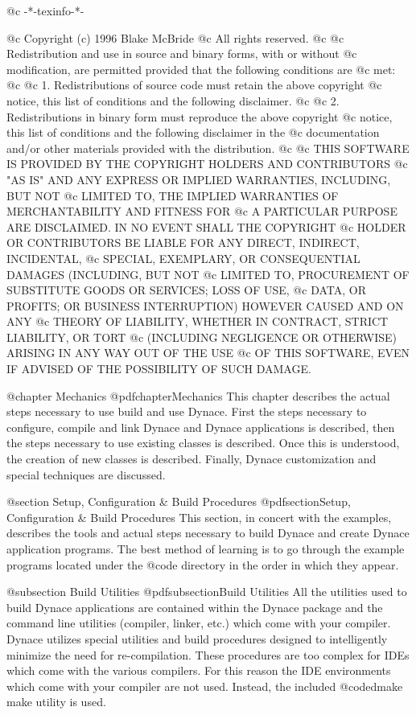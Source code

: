 @c -*-texinfo-*-

@c  Copyright (c) 1996 Blake McBride
@c  All rights reserved.
@c
@c  Redistribution and use in source and binary forms, with or without
@c  modification, are permitted provided that the following conditions are
@c  met:
@c
@c  1. Redistributions of source code must retain the above copyright
@c  notice, this list of conditions and the following disclaimer.
@c
@c  2. Redistributions in binary form must reproduce the above copyright
@c  notice, this list of conditions and the following disclaimer in the
@c  documentation and/or other materials provided with the distribution.
@c
@c  THIS SOFTWARE IS PROVIDED BY THE COPYRIGHT HOLDERS AND CONTRIBUTORS
@c  "AS IS" AND ANY EXPRESS OR IMPLIED WARRANTIES, INCLUDING, BUT NOT
@c  LIMITED TO, THE IMPLIED WARRANTIES OF MERCHANTABILITY AND FITNESS FOR
@c  A PARTICULAR PURPOSE ARE DISCLAIMED. IN NO EVENT SHALL THE COPYRIGHT
@c  HOLDER OR CONTRIBUTORS BE LIABLE FOR ANY DIRECT, INDIRECT, INCIDENTAL,
@c  SPECIAL, EXEMPLARY, OR CONSEQUENTIAL DAMAGES (INCLUDING, BUT NOT
@c  LIMITED TO, PROCUREMENT OF SUBSTITUTE GOODS OR SERVICES; LOSS OF USE,
@c  DATA, OR PROFITS; OR BUSINESS INTERRUPTION) HOWEVER CAUSED AND ON ANY
@c  THEORY OF LIABILITY, WHETHER IN CONTRACT, STRICT LIABILITY, OR TORT
@c  (INCLUDING NEGLIGENCE OR OTHERWISE) ARISING IN ANY WAY OUT OF THE USE
@c  OF THIS SOFTWARE, EVEN IF ADVISED OF THE POSSIBILITY OF SUCH DAMAGE.

@chapter Mechanics
@pdfchapter{Mechanics}
This chapter describes the actual steps necessary to use build and use
Dynace.  First the steps necessary to configure, compile and link Dynace
and Dynace applications is described, then the steps necessary to use
existing classes is described.  Once this is understood, the creation of
new classes is described.  Finally, Dynace customization and special
techniques are discussed.


@section Setup, Configuration & Build Procedures
@pdfsection{Setup, Configuration & Build Procedures}
This section, in concert with the examples, describes the tools and
actual steps necessary to build Dynace and create Dynace application
programs.  The best method of learning is to go through the example
programs located under the @code{\DYNACE\EXAMPLES} directory in the
order in which they appear.

@subsection Build Utilities
@pdfsubsection{Build Utilities}
All the utilities used to build Dynace applications are contained within
the Dynace package and the command line utilities (compiler, linker,
etc.) which come with your compiler.  Dynace utilizes special utilities
and build procedures designed to intelligently minimize the need for
re-compilation.  These procedures are too complex for IDEs which come
with the various compilers.  For this reason the IDE environments which
come with your compiler are not used.  Instead, the included
@code{dmake} make utility is used.

